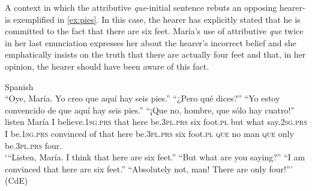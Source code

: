 A context in which the attributive \emph{que}-initial sentence rebuts an opposing hearer- is exemplified in \eqref{ex:pies}. In this case, the hearer has explicitly stated that he is committed to the fact that there are six feet. María's use of attributive \emph{que} twice in her last enunciation expresses her  about the hearer's incorrect belief and she emphatically insists on the truth that there are actually four feet and that,  in her opinion, the hearer should have been aware of this fact.

\ea\label{ex:pies}
		Spanish\\
\gll “Oye, María. Yo creo que aquí hay seis pies.” “¿Pero qué dices?” “Yo estoy convencido de que aquí hay seis pies.” “¡Que no, hombre, que sólo hay cuatro!” \\
listen María I believe.\textsc{1sg.prs} that here be.\textsc{3pl.prs} six foot.\textsc{pl} but what say.\textsc{2sg.prs} I be.\textsc{1sg.prs} convinced of that here be.\textsc{3pl.prs} six foot.\textsc{pl} \textsc{que} no man \textsc{que} only be.\textsc{3pl.prs} four.\\
\glt `“Listen, María. I think that here are six feet.” “But what are you saying?” “I am convinced that here are six feet.” “Absolutely not, man! There are only four!”' (CdE)
\z




